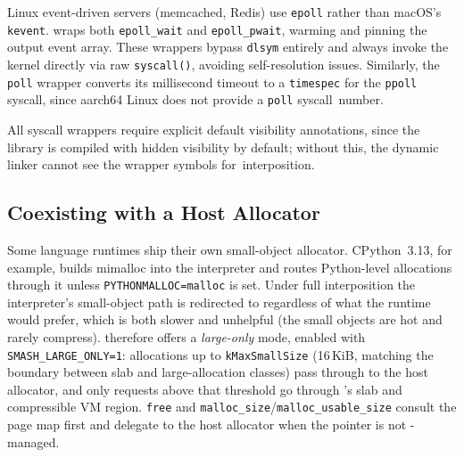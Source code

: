 Linux event-driven servers (memcached, Redis) use \texttt{epoll}
rather than macOS's \texttt{kevent}.  \sys wraps both
\texttt{epoll\_wait} and \texttt{epoll\_pwait}, warming and
pinning the output event array.  These wrappers bypass
\texttt{dlsym} entirely and always invoke the kernel directly via
raw \texttt{syscall()}, avoiding self-resolution issues.
Similarly, the \texttt{poll} wrapper converts its millisecond
timeout to a \texttt{timespec} for the \texttt{ppoll} syscall,
since aarch64 Linux does not provide a \texttt{poll}
syscall~number.

All syscall wrappers require explicit default visibility
annotations, since the library is compiled with hidden visibility
by default; without this, the dynamic linker cannot see the
wrapper symbols for~interposition.

\subsection{Coexisting with a Host Allocator}
\label{sec:impl:largeonly}

Some language runtimes ship their own small-object allocator.
CPython~3.13, for example, builds mimalloc into the interpreter and
routes Python-level allocations through it unless
\texttt{PYTHONMALLOC=malloc} is set.  Under full \sys interposition
the interpreter's small-object path is redirected to \sys regardless
of what the runtime would prefer, which is both slower and
unhelpful (the small objects are hot and rarely compress).  \sys
therefore offers a \emph{large-only} mode, enabled with
\texttt{SMASH\_\allowbreak LARGE\_\allowbreak ONLY=1}: allocations
up to \texttt{kMaxSmallSize} (16\,KiB, matching the boundary between
slab and large-allocation classes) pass through to the host
allocator, and only requests above that threshold go through \sys's
slab and compressible VM region.  \texttt{free} and
\texttt{malloc\_size}/\texttt{malloc\_\allowbreak usable\_\allowbreak size}
consult the page map first and delegate to the host allocator when
the pointer is not \sys-managed.

